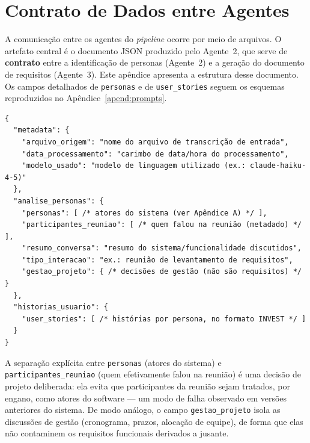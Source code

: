 \chapter{Contrato de Dados entre Agentes}
\label{apend:contrato}

A comunicação entre os agentes do \textit{pipeline} ocorre por meio de arquivos. O artefato central é o documento JSON produzido pelo Agente~2, que serve de \textbf{contrato} entre a identificação de personas (Agente~2) e a geração do documento de requisitos (Agente~3). Este apêndice apresenta a estrutura desse documento. Os campos detalhados de \texttt{personas} e de \texttt{user\_stories} seguem os esquemas reproduzidos no Apêndice~\ref{apend:prompts}.

{\footnotesize
\begin{verbatim}
{
  "metadata": {
    "arquivo_origem": "nome do arquivo de transcrição de entrada",
    "data_processamento": "carimbo de data/hora do processamento",
    "modelo_usado": "modelo de linguagem utilizado (ex.: claude-haiku-4-5)"
  },
  "analise_personas": {
    "personas": [ /* atores do sistema (ver Apêndice A) */ ],
    "participantes_reuniao": [ /* quem falou na reunião (metadado) */ ],
    "resumo_conversa": "resumo do sistema/funcionalidade discutidos",
    "tipo_interacao": "ex.: reunião de levantamento de requisitos",
    "gestao_projeto": { /* decisões de gestão (não são requisitos) */ }
  },
  "historias_usuario": {
    "user_stories": [ /* histórias por persona, no formato INVEST */ ]
  }
}
\end{verbatim}
}

A separação explícita entre \texttt{personas} (atores do sistema) e \texttt{participantes\_reuniao} (quem efetivamente falou na reunião) é uma decisão de projeto deliberada: ela evita que participantes da reunião sejam tratados, por engano, como atores do software --- um modo de falha observado em versões anteriores do sistema. De modo análogo, o campo \texttt{gestao\_projeto} isola as discussões de gestão (cronograma, prazos, alocação de equipe), de forma que elas não contaminem os requisitos funcionais derivados a jusante.
